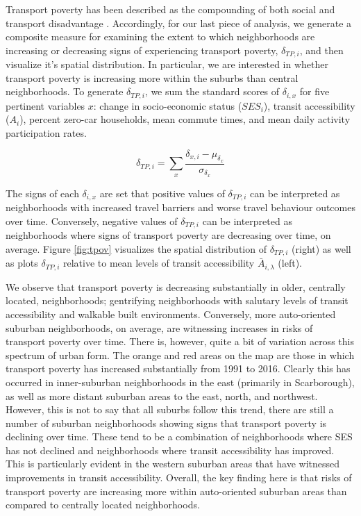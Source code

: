 Transport poverty has been described as the compounding of both social and transport disadvantage \cite{lucas_transport_2012, lucas_is_2018}. Accordingly, for our last piece of analysis, we generate a composite measure for examining the extent to which neighborhoods are increasing or decreasing signs of experiencing transport poverty, $\delta_{TP,i}$, and then visualize it's spatial distribution. In particular, we are interested in whether transport poverty is increasing more within the suburbs than central neighborhoods. To generate $\delta_{TP,i}$, we sum the standard scores of $\delta_{i,x}$ for five pertinent variables $x$: change in socio-economic status ($SES_i$), transit accessibility ($A_i$), percent zero-car households, mean commute times, and mean daily activity participation rates. 

\begin{equation}
\delta_{TP,i} = \sum_x \frac{\delta_{x,i} - \mu_{\delta_{x}}}{\sigma_{\delta_{x}}}
\end{equation}

The signs of each $\delta_{i,x}$ are set that positive values of $\delta_{TP,i}$ can be interpreted as neighborhoods with increased travel barriers and worse travel behaviour outcomes over time. Conversely, negative values of $\delta_{TP,i}$ can be interpreted as neighborhoods where signs of transport poverty are decreasing over time, on average. Figure \ref{fig:tpov} visualizes the spatial distribution of $\delta_{TP,i}$ (right) as well as plots $\delta_{TP,i}$ relative to mean levels of transit accessibility $\bar{A}_{i,\lambda}$ (left).

We observe that transport poverty is decreasing substantially in older, centrally located, neighborhoods; gentrifying neighborhoods with salutary levels of transit accessibility and walkable built environments. Conversely, more auto-oriented suburban neighborhoods, on average, are witnessing increases in risks of transport poverty over time. There is, however, quite a bit of variation across this spectrum of urban form. The orange and red areas on the map are those in which transport poverty has increased substantially from 1991 to 2016. Clearly this has occurred in inner-suburban neighborhoods in the east (primarily in Scarborough), as well as more distant suburban areas to the east, north, and northwest. However, this is not to say that all suburbs follow this trend, there are still a number of suburban neighborhoods showing signs that transport poverty is declining over time. These tend to be a combination of neighborhoods where SES has not declined and neighborhoods where transit accessibility has improved. This is particularly evident in the western suburban areas that have witnessed improvements in transit accessibility. Overall, the key finding here is that risks of transport poverty are increasing more within auto-oriented suburban areas than compared to centrally located neighborhoods. 


